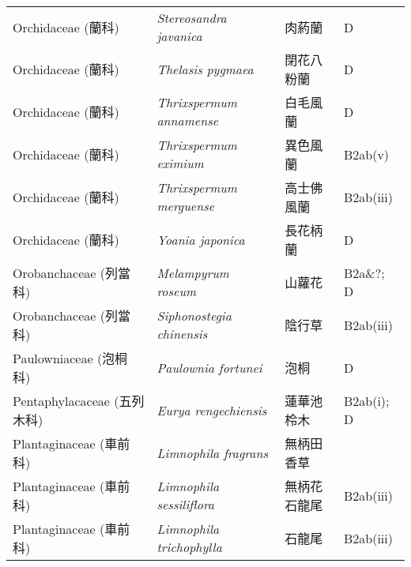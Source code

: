 \begin{longtable}{p{3cm}p{5cm}p{3cm}p{4cm}}
    Orchidaceae (蘭科) & \textit{Stereosandra javanica}  & 肉葯蘭 & D \index{Stereosandra@\textit{Stereosandra}!javanica@\textit{javanica}}  \index{肉葯蘭} \\
    Orchidaceae (蘭科) & \textit{Thelasis pygmaea}  & 閉花八粉蘭 & D \index{Thelasis@\textit{Thelasis}!pygmaea@\textit{pygmaea}}  \index{閉花八粉蘭} \\
    Orchidaceae (蘭科) & \textit{Thrixspermum annamense}  & 白毛風蘭 & D \index{Thrixspermum@\textit{Thrixspermum}!annamense@\textit{annamense}}  \index{白毛風蘭} \\
    Orchidaceae (蘭科) & \textit{Thrixspermum eximium}  & 異色風蘭 & B2ab(v) \index{Thrixspermum@\textit{Thrixspermum}!eximium@\textit{eximium}}  \index{異色風蘭} \\
    Orchidaceae (蘭科) & \textit{Thrixspermum merguense}  & 高士佛風蘭 & B2ab(iii) \index{Thrixspermum@\textit{Thrixspermum}!merguense@\textit{merguense}}  \index{高士佛風蘭} \\
    Orchidaceae (蘭科) & \textit{Yoania japonica}  & 長花柄蘭 & D \index{Yoania@\textit{Yoania}!japonica@\textit{japonica}}  \index{長花柄蘭} \\
    Orobanchaceae (列當科) & \textit{Melampyrum roseum}  & 山蘿花 & B2a\&?; D \index{Melampyrum@\textit{Melampyrum}!roseum@\textit{roseum}}  \index{山蘿花} \\
    Orobanchaceae (列當科) & \textit{Siphonostegia chinensis}  & 陰行草 & B2ab(iii) \index{Siphonostegia@\textit{Siphonostegia}!chinensis@\textit{chinensis}}  \index{陰行草} \\
    Paulowniaceae (泡桐科) & \textit{Paulownia fortunei}  & 泡桐 & D \index{Paulownia@\textit{Paulownia}!fortunei@\textit{fortunei}}  \index{泡桐} \\
    Pentaphylacaceae (五列木科) & \textit{Eurya rengechiensis}  & 蓮華池柃木 & B2ab(i); D \index{Eurya@\textit{Eurya}!rengechiensis@\textit{rengechiensis}}  \index{蓮華池柃木} \\
    Plantaginaceae (車前科) & \textit{Limnophila fragrans}  & 無柄田香草 &  \index{Limnophila@\textit{Limnophila}!fragrans@\textit{fragrans}}  \index{無柄田香草} \\
    Plantaginaceae (車前科) & \textit{Limnophila sessiliflora}  & 無柄花石龍尾 & B2ab(iii) \index{Limnophila@\textit{Limnophila}!sessiliflora@\textit{sessiliflora}}  \index{無柄花石龍尾} \\
    Plantaginaceae (車前科) & \textit{Limnophila trichophylla}  & 石龍尾 & B2ab(iii) \index{Limnophila@\textit{Limnophila}!trichophylla@\textit{trichophylla}}  \index{石龍尾} \\

\end{longtable}
